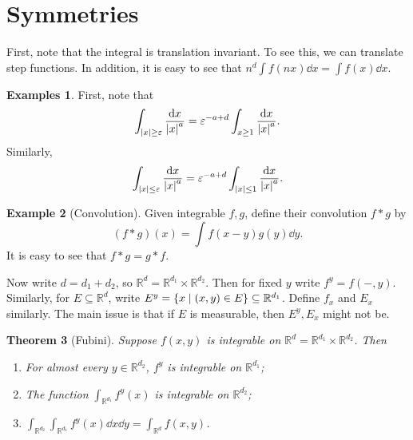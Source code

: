\documentclass[leqno, openany]{memoir}
\newtheorem{thm}{Theorem}[chapter]
\theoremstyle{definition}
\newtheorem{exm}[thm]{Example}
\newtheorem{exms}[thm]{Examples}
\theoremstyle{remark}
\theoremstyle{plain}
\theoremstyle{definition}
\theoremstyle{remark}
\newcommand{\R}{\mathbb{R}}
\newcommand{\ep}{\varepsilon}
\begin{document}
\section{Symmetries}%
\label{sec:symmetries}

First, note that the integral is translation invariant. To see this, we can translate step functions. In addition, it is easy to see that $n^d \int f(nx) \dd{x} = \int f(x) \dd{x}$.

\begin{exms}
    First, note that
    \[ \int_{\abs{x} \geq \ep} \frac{\dd{x}}{\abs{x}^a} = \ep^{-a+d} \int_{x \geq 1} \frac{\dd{x}}{\abs{x}^a}. \]
    Similarly, 
    \[ \int_{\abs{x} \leq \ep} \frac{\dd{x}}{\abs{x}^a} = \ep^{-a+d} \int_{\abs{x} \leq 1} \frac{\dd{x}}{\abs{x}^a}. \]
\end{exms}

\begin{exm}[Convolution]
    Given integrable $f,g$, define their convolution $f * g$ by
    \[ (f * g)(x) = \int f(x-y)g(y) \dd{y}. \]
    It is easy to see that $f * g = g * f$.
\end{exm}

Now write $d = d_1 + d_2$, so $\R^d = \R^{d_1} \times \R^{d_2}$. Then for fixed $y$ write $f^y = f(-,y)$. Similarly, for $E \subseteq \R^d$, write $E^y = \qty{x \mid (x,y) \in E} \subseteq \R^{d_1}$. Define $f_x$ and $E_x$ similarly. The main issue is that if $E$ is measurable, then $E^y, E_x$ might not be.

\begin{thm}[Fubini]
    Suppose $f(x,y)$ is integrable on $\R^d = \R^{d_1} \times \R^{d_2}$. Then
    \begin{enumerate}
        \item For almost every $y \in \R^{d_2}$, $f^y$ is integrable on $\R^{d_1}$;
        \item The function $\int_{\R^{d_1}} f^y(x)$ is integrable on $\R^{d_2}$;
        \item $\int_{\R^{d_2}} \int_{\R^{d_1}} f^y(x) \dd{x} \dd{y} = \int_{\R^d} f(x,y)$.
    \end{enumerate}
\end{thm}
\end{document}
